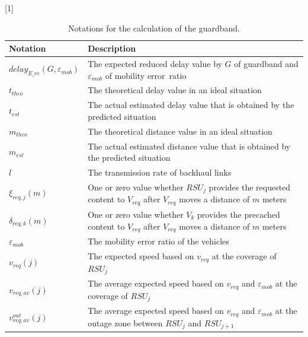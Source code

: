 \documentclass[electronics,aricle,accept,pdftex,moreauthors]{Definitions/mdpi}
\begin{document}
\begin{table}[H] %
\tablesize{\footnotesize}

    \caption{Notations for the calculation of the guardband.}
 \setlength{\cellWidtha}{\textwidth/2-2\tabcolsep-1.6in}
\setlength{\cellWidthb}{\textwidth/2-2\tabcolsep+1.6in}
\scalebox{1}[1]{\begin{tabularx}{\textwidth}{>{\centering\arraybackslash}m{\cellWidtha}>{\raggedright
\arraybackslash}m{\cellWidthb}}
\toprule

        \textbf{Notation} & \textbf{Description} \\
       \midrule

        $delay_{E\_re}(G, \varepsilon_{mob})$ & The expected reduced delay value by $G$ of guardband and $\varepsilon_{mob}$ of mobility error~ratio \\
        $t_{theo}$ & The theoretical delay value in an ideal situation \\
        $t_{est}$ & The actual estimated delay value that is obtained by the predicted situation \\
        $m_{theo}$ & The theoretical distance value in an ideal situation \\
        $m_{est}$ & The actual estimated distance value that is obtained by the predicted situation \\
        $l$ & The transmission rate of backhaul links \\
        $\xi_{req, j}(m)$ & One or zero value whether $RSU_{j}$ provides the requested content to $V_{req}$ after $V_{req}$ moves a distance of $m$ meters\\
        $\delta_{req, k}(m)$ & One or zero value whether $V_{k}$ provides the precached content to $V_{req}$ after $V_{req}$ moves a distance of $m$ meters \\
        $\varepsilon_{mob}$ & The mobility error ratio of the vehicles \\
        $v_{req}(j)$ & The expected speed based on $v_{req}$ at the coverage of $RSU_{j}$ \\
        $v_{req, av}(j)$ & The average expected speed based on $v_{req}$ and $\varepsilon_{mob}$ at the coverage of $RSU_{j}$ \\
        $v^{out}_{req, av}(j)$ & The average expected speed based on $v_{req}$ and $\varepsilon_{mob}$ at the outage zone between $RSU_{j}$ and $RSU_{j+1}$ \\

\end{tabularx}}
\end{table}
\end{document}
